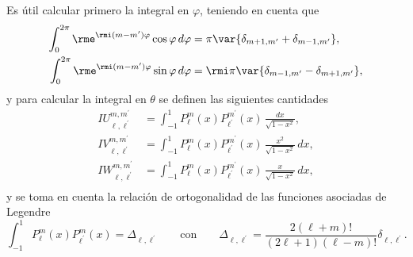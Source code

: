 Es útil calcular primero la integral en $\varphi$, teniendo en cuenta que 
\begin{align}
\int_0^{2\pi} \rme^{\rmi (m-m^{\prime}) \varphi} \cos\varphi  \, d\varphi &= \pi \var{ \delta_{m+1, m^{\prime}} + \delta_{m-1, m^{\prime}} },\\
\int_0^{2\pi} \rme^{\rmi (m-m^{\prime}) \varphi} \sin\varphi  \, d\varphi &= \rmi \pi \var{ \delta_{m-1, m^{\prime}} - \delta_{m+1, m^{\prime}} },
\end{align}
y para calcular la integral en $\theta$ se definen las siguientes cantidades
\begin{align}
IU_{\ell,\ell^{\prime}}^{m,m^{\prime}} &=\int_{-1}^1 P_{\ell}^{m}(x) P_{\ell^{\prime}}^{m^{\prime}}(x) \, \frac{dx}{\sqrt{1-x^2}}, \\
IV_{\ell,\ell^{\prime}}^{m,m^{\prime}} &=\int_{-1}^1 P_{\ell}^{m}(x) P_{\ell^{\prime}}^{m^{\prime}}(x) \, \frac{x^2}{\sqrt{1-x^2}} \, dx, \\
IW_{\ell,\ell^{\prime}}^{m,m^{\prime}} &=\int_{-1}^1 P_{\ell}^{m}(x) P_{\ell^{\prime}}^{m^{\prime}}(x) \, \frac{x}{\sqrt{1-x^2}} \, dx, \\
\end{align}
y se toma en cuenta la relación de ortogonalidad de las funciones asociadas de Legendre \cite{Abramowitz}
\begin{equation}
\int_{-1}^{1} P_{\ell}^{m}(x) P_{\ell^{\prime}}^{m}(x) = \Delta_{\ell, \ell^{\prime}} \qquad \text{con} \qquad \Delta_{\ell, \ell^{\prime}}= \frac{2(\ell+m)!}{(2\ell+1)(\ell-m)!} \delta_{\ell, \ell^{\prime}}.
\end{equation}